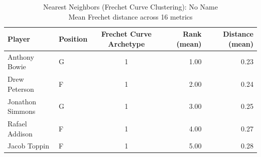 \begin{table}[t]
\caption*{
{\fontsize{20}{25} Nearest Neighbors (Frechet Curve Clustering): No Name\fontsize{12}{15}\selectfont } \\ 
{\fontsize{14}{17}\selectfont  Mean Frechet distance across 16 metrics\fontsize{12}{15}\selectfont }
} 
\fontsize{12.0pt}{14.0pt}\selectfont
\begin{tabular*}{\linewidth}{@{\extracolsep{\fill}}llcrr}
\toprule
Player & Position & Frechet Curve Archetype & Rank (mean) & Distance (mean) \\ 
\midrule\addlinespace[2.5pt]
Anthony Bowie & G & 1 & 1.00 & 0.23 \\ 
Drew Peterson & F & 1 & 2.00 & 0.24 \\ 
Jonathon Simmons & G & 1 & 3.00 & 0.25 \\ 
Rafael Addison & F & 1 & 4.00 & 0.27 \\ 
Jacob Toppin & F & 1 & 5.00 & 0.28 \\ 
\bottomrule
\end{tabular*}
\end{table}

